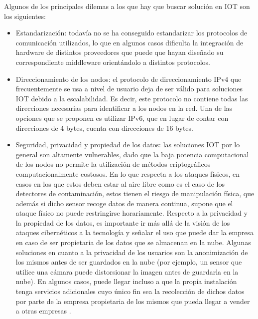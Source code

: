 Algunos de los principales dilemas a los que hay que buscar solución en IOT son los siguientes:
\begin{itemize}
    \item Estandarización: todavía no se ha conseguido estandarizar los protocolos de comunicación utilizados, lo que en algunos casos dificulta la integración de hardware de distintos proveedores que puede que hayan diseñado su correspondiente middleware orientándolo a distintos protocolos.
    
    \item Direccionamiento de los nodos: el protocolo de direccionamiento IPv4 que frecuentemente se usa a nivel de usuario deja de ser válido para soluciones IOT debido a la escalabilidad. Es decir, este protocolo no contiene todas las direcciones necesarias para identificar a los nodos en la red. Una de las opciones que se proponen es utilizar IPv6, que en lugar de contar con direcciones de 4 bytes, cuenta con direcciones de 16 bytes.
    
    \item Seguridad, privacidad y propiedad de los datos: las soluciones IOT por lo general son altamente vulnerables, dado que la baja potencia computacional de los nodos no permite la utilización de métodos criptográficos computacionalmente costosos. En lo que respecta a los ataques físicos, en casos en los que estos deben estar al aire libre como es el caso de los detectores de contaminación, estos tienen el riesgo de manipulación física, que además si dicho sensor recoge datos de manera continua, supone que el ataque físico no puede restringirse horariamente. Respecto a la privacidad y la propiedad de los datos, es importante ir más allá de la visión de los ataques cibernéticos a la tecnología y señalar el uso que puede dar la empresa en caso de ser propietaria de los datos que se almacenan en la nube. Algunas soluciones en cuanto a la privacidad de los usuarios son la anonimización de los mismos antes de ser guardados en la nube (por ejemplo, un sensor que utilice una cámara puede distorsionar la imagen antes de guardarla en la nube). En algunos casos, puede llegar incluso a que la propia instalación tenga servicios adicionales cuyo único fin sea la recolección de dichos datos por parte de la empresa propietaria de los mismos \citep{roomba} que pueda llegar a vender a otras empresas \citep{venkataramanan2014my}.
\end{itemize}


